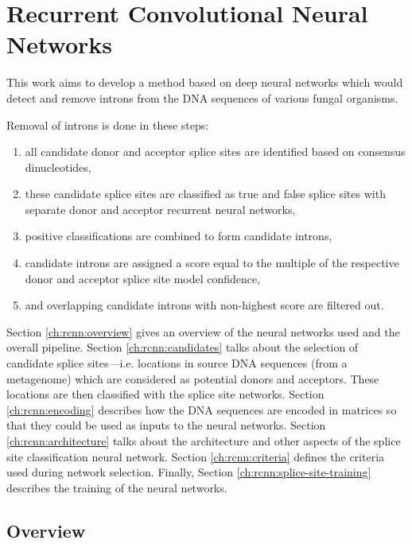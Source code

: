 \chapter{\label{ch:rcnn}Recurrent Convolutional Neural Networks}

\minitoc

This work aims to develop a method based on deep neural networks which would
detect and remove introns from the DNA sequences of various fungal organisms.

Removal of introns is done in these steps:

\begin{enumerate}
  \item all candidate donor and acceptor splice sites are identified based on
    consensus dinucleotides,
  \item these candidate splice sites are classified as true and false splice
    sites with separate donor and acceptor recurrent neural networks,
  \item positive classifications are combined to form candidate introns,
  \item candidate introns are assigned a score equal to the multiple of the
    respective donor and acceptor splice site model confidence,
  \item and overlapping candidate introns with non-highest score are filtered
    out.
\end{enumerate}

Section \ref{ch:rcnn:overview} gives an overview of the neural networks used
and the overall pipeline. Section \ref{ch:rcnn:candidates} talks about the
selection of candidate splice sites---i.e. locations in source DNA sequences
(from a metagenome) which are considered as potential donors and acceptors.
These locations are then classified with the splice site networks. Section
\ref{ch:rcnn:encoding} describes how the DNA sequences are encoded in matrices
so that they could be used as inputs to the neural networks. Section
\ref{ch:rcnn:architecture} talks about the architecture and other aspects of
the splice site classification neural network. Section \ref{ch:rcnn:criteria}
defines the criteria used during network selection. Finally, Section
\ref{ch:rcnn:splice-site-training} describes the training of the neural
networks.

\section{\label{ch:rcnn:overview}Overview}

